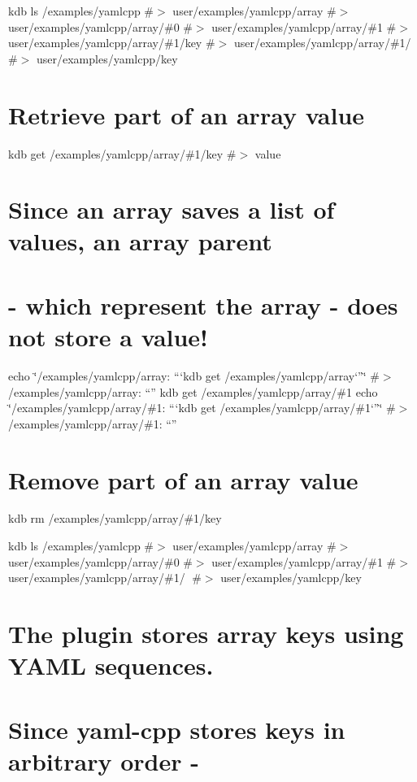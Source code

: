 kdb ls /examples/yamlcpp \#$>$ user/examples/yamlcpp/array \#$>$ user/examples/yamlcpp/array/\#0 \#$>$ user/examples/yamlcpp/array/\#1 \#$>$ user/examples/yamlcpp/array/\#1/key \#$>$ user/examples/yamlcpp/array/\#1/🔑 \#$>$ user/examples/yamlcpp/key

\section*{Retrieve part of an array value}

kdb get /examples/yamlcpp/array/\#1/key \#$>$ value

\section*{Since an array saves a list of values, an array parent}

\section*{-\/ which represent the array -\/ does not store a value!}

echo \char`\"{}/examples/yamlcpp/array\+: “`kdb get /examples/yamlcpp/array`”\char`\"{} \#$>$ /examples/yamlcpp/array\+: “” kdb get /examples/yamlcpp/array/\#1 echo \char`\"{}/examples/yamlcpp/array/\#1\+: “`kdb get /examples/yamlcpp/array/\#1`”\char`\"{} \#$>$ /examples/yamlcpp/array/\#1\+: “”

\section*{Remove part of an array value}

kdb rm /examples/yamlcpp/array/\#1/key

kdb ls /examples/yamlcpp \#$>$ user/examples/yamlcpp/array \#$>$ user/examples/yamlcpp/array/\#0 \#$>$ user/examples/yamlcpp/array/\#1 \#$>$ user/examples/yamlcpp/array/\#1/🔑 \#$>$ user/examples/yamlcpp/key

\section*{The plugin stores array keys using Y\+A\+ML sequences.}

\section*{Since yaml-\/cpp stores keys in arbitrary order -\/}


